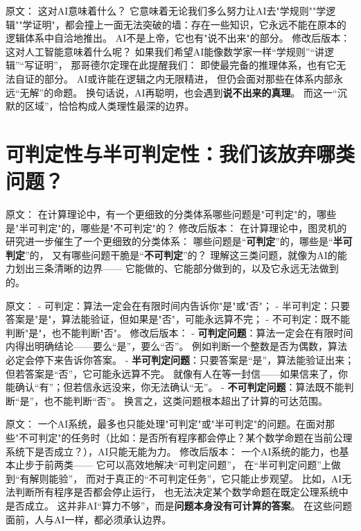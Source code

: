 原文：
这对AI意味着什么？
它意味着无论我们多么努力让AI去"学规则""学逻辑""学证明"，都会撞上一面无法突破的墙：存在一些知识，它永远不能在原本的逻辑体系中自洽地推出。
AI不是上帝，它也有"说不出来"的部分。
修改后版本：
这对人工智能意味着什么呢？  
如果我们希望AI能像数学家一样“学规则”“讲逻辑”“写证明”，  
那哥德尔定理在此提醒我们：  
即使最完备的推理体系，也有它无法自证的部分。  
AI或许能在逻辑之内无限精进，  
但仍会面对那些在体系内部永远“无解”的命题。  
换句话说，AI再聪明，也会遇到\textbf{说不出来的真理}。  
而这一“沉默的区域”，恰恰构成人类理性最深的边界。

\section*{可判定性与半可判定性：我们该放弃哪类问题？}

原文：
在计算理论中，有一个更细致的分类体系哪些问题是"可判定"的，哪些是"半可判定"的，哪些是"不可判定"的？
修改后版本：
在计算理论中，图灵机的研究进一步催生了一个更细致的分类体系：  
哪些问题是“\textbf{可判定}”的，哪些是“\textbf{半可判定}”的，  
又有哪些问题干脆是“\textbf{不可判定}”的？  
理解这三类问题，就像为AI的能力划出三条清晰的边界——  
它能做的、它能部分做到的，以及它永远无法做到的。



原文：
- 可判定：算法一定会在有限时间内告诉你"是"或"否"；
- 半可判定：只要答案是"是"，算法能验证，但如果是"否"，可能永远算不完；
- 不可判定：既不能判断"是"，也不能判断"否"。
修改后版本：
- \textbf{可判定问题}：算法一定会在有限时间内得出明确结论——要么“是”，要么“否”。  
  例如判断一个整数是否为偶数，算法必定会停下来告诉你答案。  
- \textbf{半可判定问题}：只要答案是“是”，算法能验证出来；但若答案是“否”，它可能永远算不完。  
  就像有人在等一封信——如果信来了，你能确认“有”；但若信永远没来，你无法确认“无”。  
- \textbf{不可判定问题}：算法既不能判断“是”，也不能判断“否”。  
  换言之，这类问题根本超出了计算的可达范围。



原文：
一个AI系统，最多也只能处理"可判定"或"半可判定"的问题。在面对那些"不可判定"的任务时（比如：是否所有程序都会停止？某个数学命题在当前公理系统下是否成立？），AI只能无能为力。
修改后版本：
一个AI系统的能力，也基本止步于前两类——  
它可以高效地解决“可判定问题”，  
在“半可判定问题”上做到“有解则能验”，  
而对于真正的“不可判定任务”，它只能止步观望。  
比如，AI无法判断所有程序是否都会停止运行，  
也无法决定某个数学命题在既定公理系统中是否成立。  
这并非AI“算力不够”，而是\textbf{问题本身没有可计算的答案}。  
在这些问题面前，人与AI一样，都必须承认边界。



